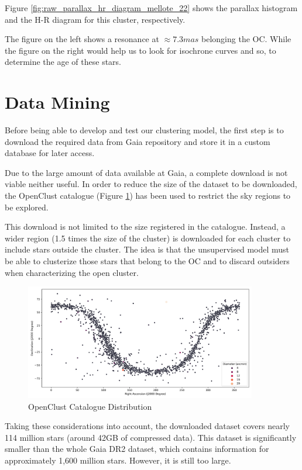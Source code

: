 \documentclass[11pt, a4paper, english]{book}
\begin{document}
Figure \ref{fig:raw_parallax_hr_diagram_mellote_22} shows the parallax histogram and the H-R diagram for this cluster, respectively.

The figure on the left shows a resonance at $\approx 7.3mas$ belonging the OC.
While the figure on the right would help us to look for isochrone curves and so,
to determine the age of these stars.

\section{Data Mining}
\label{sec:data_mining}

Before being able to develop and test our clustering model,
the first step is to download the required data from Gaia repository
and store it in a custom database for later access.

Due to the large amount of data available at Gaia, a complete download is not viable neither useful.
In order to reduce the size of the dataset to be downloaded,
the OpenClust catalogue \cite{dias2002new} (Figure \ref{fig:OpenClustComplete})
has been used to restrict the sky regions to be explored.

This download is not limited to the size registered in the catalogue.
Instead, a wider region (1.5 times the size of the cluster) is downloaded for each cluster to include stars outside the cluster.
The idea is that the unsupervised model must be able to clusterize those stars that belong to the OC
and to discard outsiders when characterizing the open cluster.

\begin{figure}[htbp]
  \centering
  \includegraphics[width=0.9\textwidth]{../figures/openclust_catalogue.png}
  \caption{OpenClust Catalogue Distribution}
  \label{fig:OpenClustComplete}
\end{figure}

Taking these considerations into account, the downloaded dataset covers nearly 114 million stars (around 42GB of compressed data).
This dataset is significantly smaller than the whole Gaia DR2 dataset,
which contains information for approximately 1,600 million stars.
However, it is still too large.
\end{document}
